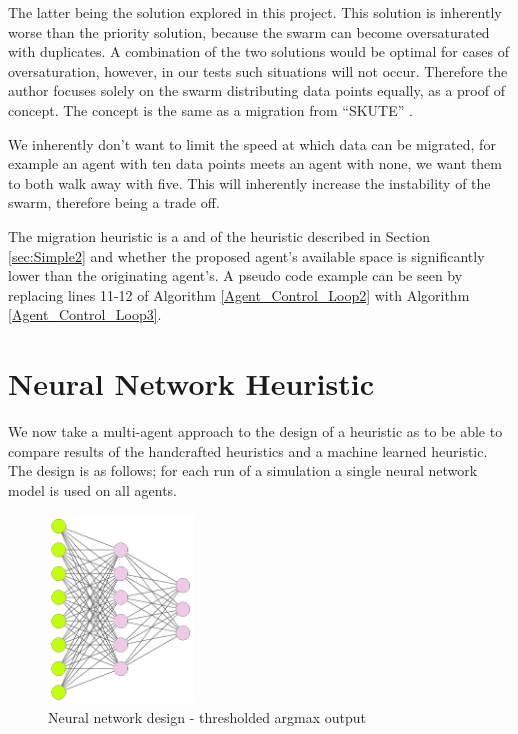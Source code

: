 \documentclass{UoYCSproject}
\begin{document}
The latter being the solution explored in this project. 
This solution is inherently worse than the priority solution, because the swarm can become oversaturated with duplicates. 
A combination of the two solutions would be optimal for cases of oversaturation, however, in our tests such situations will not occur. 
Therefore the author focuses solely on the swarm distributing data points equally, as a proof of concept. 
The concept is the same as a migration from “SKUTE” \cite{Distributed Storage}.

We inherently don’t want to limit the speed at which data can be migrated, for example an agent with ten data points meets an agent with none, we want them to both walk away with five. 
This will inherently increase the instability of the swarm, therefore being a trade off.

The migration heuristic is a and of the heuristic described in Section \ref{sec:Simple2} and whether the proposed agent's available space is significantly lower than the originating agent’s. 
A pseudo code example can be seen by replacing lines 11-12 of Algorithm \ref{Agent_Control_Loop2} with Algorithm \ref{Agent_Control_Loop3}.


\section{Neural Network Heuristic}
\label{sec:Simple5}

We now take a multi-agent approach to the design of a heuristic as to be able to compare results of the handcrafted heuristics and a machine learned heuristic. The design is as follows; for each run of a simulation a single neural network model is used on all agents.

\begin{figure}[htb]
\label{fig:Neural network}
\begin{center}
\centering
\includegraphics[height=5cm]{"./ExplanationImgs/NN.png"}
\caption{Neural network design - thresholded argmax output}
\end{center}
\end{figure}
\end{document}
